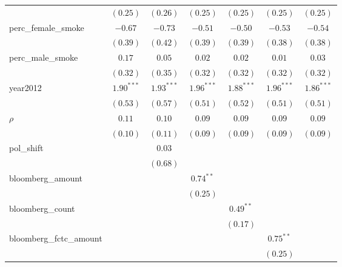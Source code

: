 \begin{table}[!h]
\begin{center}
\begin{tabular}{l c c c c c c }
                        & $(0.25)$     & $(0.26)$     & $(0.25)$     & $(0.25)$     & $(0.25)$     & $(0.25)$     \\
perc\_female\_smoke     & $-0.67$      & $-0.73$      & $-0.51$      & $-0.50$      & $-0.53$      & $-0.54$      \\
                        & $(0.39)$     & $(0.42)$     & $(0.39)$     & $(0.39)$     & $(0.38)$     & $(0.38)$     \\
perc\_male\_smoke       & $0.17$       & $0.05$       & $0.02$       & $0.02$       & $0.01$       & $0.03$       \\
                        & $(0.32)$     & $(0.35)$     & $(0.32)$     & $(0.32)$     & $(0.32)$     & $(0.32)$     \\
year2012                & $1.90^{***}$ & $1.93^{***}$ & $1.96^{***}$ & $1.88^{***}$ & $1.96^{***}$ & $1.86^{***}$ \\
                        & $(0.53)$     & $(0.57)$     & $(0.51)$     & $(0.52)$     & $(0.51)$     & $(0.51)$     \\
$\rho$                  & $0.11$       & $0.10$       & $0.09$       & $0.09$       & $0.09$       & $0.09$       \\
                        & $(0.10)$     & $(0.11)$     & $(0.09)$     & $(0.09)$     & $(0.09)$     & $(0.09)$     \\
pol\_shift              &              & $0.03$       &              &              &              &              \\
                        &              & $(0.68)$     &              &              &              &              \\
bloomberg\_amount       &              &              & $0.74^{**}$  &              &              &              \\
                        &              &              & $(0.25)$     &              &              &              \\
bloomberg\_count        &              &              &              & $0.49^{**}$  &              &              \\
                        &              &              &              & $(0.17)$     &              &              \\
bloomberg\_fctc\_amount &              &              &              &              & $0.75^{**}$  &              \\
                        &              &              &              &              & $(0.25)$     &              \\

\end{tabular}
\end{center}
\end{table}
